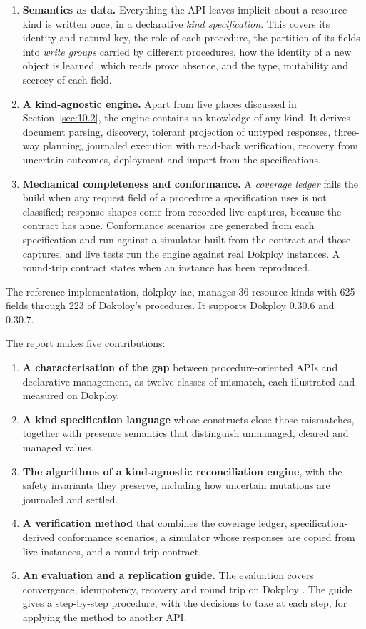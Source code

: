 \begin{enumerate}
\def\labelenumi{\arabic{enumi}.}
\item
  \textbf{Semantics as data.} Everything the API leaves implicit about a resource kind is written once, in a
  declarative \emph{kind specification}. This covers its identity and natural key, the role of each
  procedure, the partition of its fields into \emph{write groups} carried by different procedures, how the
  identity of a new object is learned, which reads prove absence, and the type, mutability and secrecy
  of each field.
\item
  \textbf{A kind-agnostic engine.} Apart from five places discussed in Section~\ref{sec:10.2}, the engine
  contains no knowledge of any kind. It derives document
  parsing, discovery, tolerant projection of untyped responses, three-way planning, journaled
  execution with read-back verification, recovery from uncertain outcomes, deployment and import
  from the specifications.
\item
  \textbf{Mechanical completeness and conformance.} A \emph{coverage ledger} fails the build when any request field of a procedure a
  specification uses is not classified; response shapes come from recorded live captures, because
  the contract has none. Conformance scenarios are generated from each specification and run
  against a simulator built from the contract and those captures, and live tests run the engine
  against real Dokploy instances. A round-trip
  contract states when an instance has been reproduced.
\end{enumerate}

The reference implementation, dokploy-iac, manages 36 resource kinds with 625 fields through 223
of Dokploy's procedures. It supports Dokploy 0.30.6 and 0.30.7.

The report makes five contributions:

\begin{enumerate}
\def\labelenumi{\arabic{enumi}.}
\item
  \textbf{A characterisation of the gap} between procedure-oriented APIs and declarative management, as
  twelve classes of mismatch, each illustrated and measured on Dokploy.
\item
  \textbf{A kind specification language} whose constructs close those mismatches, together with
  presence semantics that distinguish unmanaged, cleared and managed values.
\item
  \textbf{The algorithms of a kind-agnostic reconciliation engine}, with the safety invariants they
  preserve, including how uncertain mutations are journaled and settled.
\item
  \textbf{A verification method} that combines the coverage ledger, specification-derived conformance
  scenarios, a simulator whose responses are copied from live
  instances, and a round-trip contract.
\item
  \textbf{An evaluation and a replication guide.} The evaluation covers convergence, idempotency,
  recovery and round trip on Dokploy . The guide gives a step-by-step
  procedure, with the decisions to take at each step, for applying the method to another API.
\end{enumerate}

